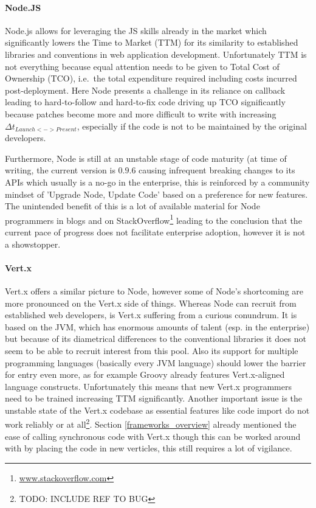 \paragraph{Node.JS}
Node.js allows for leveraging the JS skills already in the market which significantly lowers the Time to Market (TTM) for its similarity to established libraries and conventions in web application development. Unfortunately TTM is not everything because equal attention needs to be given to Total Cost of Ownership (TCO), i.e.\ the total expenditure required including costs incurred post-deployment. Here Node presents a challenge in its reliance on callback leading to hard-to-follow and hard-to-fix code driving up TCO significantly because patches become more and more difficult to write with increasing $\Delta t_{Launch<->Present}$, especially if the code is not to be maintained by the original developers.

Furthermore, Node is still at an unstable stage of code maturity (at time of writing, the current version is $0.9.6$ causing infrequent breaking changes to its APIs which usually is a no-go in the enterprise, this is reinforced by a community mindset of 'Upgrade Node, Update Code' based on a preference for new features. The unintended benefit of this is a lot of available material for Node programmers in blogs and on StackOverflow\footnote{\url{www.stackoverflow.com}} leading to the conclusion that the current pace of progress does not facilitate enterprise adoption, however it is not a showstopper.

\paragraph{Vert.x}
Vert.x offers a similar picture to Node, however some of Node's shortcoming are more pronounced on the Vert.x side of things. Whereas Node can recruit from established web developers, is Vert.x suffering from a curious conundrum. It is based on the JVM, which has enormous amounts of talent (esp. in the enterprise) but because of its diametrical differences to the conventional libraries it does not seem to be able to recruit interest from this pool. Also its support for multiple programming languages (basically every JVM language) should lower the barrier for entry even more, as for example Groovy already features Vert.x-aligned language constructs. Unfortunately this means that new Vert.x programmers need to be trained increasing TTM significantly.
Another important issue is the unstable state of the Vert.x codebase as essential features like code import do not work reliably or at all\footnote{TODO: INCLUDE REF TO BUG}. Section \ref{frameworks_overview} already mentioned the ease of calling synchronous code with Vert.x though this can be worked around with by placing the code in new verticles, this still requires a lot of vigilance.

